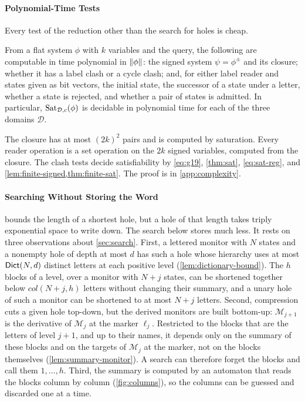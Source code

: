 \paragraph{Polynomial-Time Tests}
Every test of the reduction other than the search for holes is cheap.

\begin{lemma}\label{lem:poly-tests}
From a flat system $\phi$ with $k$ variables and the query, the following are
computable in time polynomial in $\|\phi\|$: the signed system
$\psi=\phi^\pm$ and its closure; whether it has a
label clash or a cycle clash; and, for either label reader and states given
as bit vectors, the initial state, the successor of a state under a letter,
whether a state is rejected, and whether a pair of states is admitted. In
particular, $\operatorname{Sat}_{\mathcal D,c}(\phi)$ is decidable in polynomial time for
each of the three domains $\mathcal D$.
\end{lemma}

The closure has at most $(2k)^2$ pairs and is computed by saturation. Every
reader operation is a set operation on the $2k$ signed variables, computed
from the closure. The clash tests decide satisfiability by \eqref{eq:g19},
\cref{thm:sat}, \eqref{eq:sat-reg}, and \cref{lem:finite-signed,thm:finite-sat}.
The proof is in \cref{app:complexity}.

\paragraph{Searching Without Storing the Word}
 bounds the length of a shortest hole, but a hole of
that length takes triply exponential space to write down. The search below
stores much less. It rests on three observations about \cref{sec:search}.
First, a lettered monitor with $N$ states and a nonempty hole of depth at
most $d$ has such a hole whose hierarchy uses at most $\mathsf{Dict}(N,d)$ distinct letters at each positive
level (\cref{lem:dictionary-bound}). The $h$ blocks of a level, over a monitor
with $N+j$ states, can be shortened together below $\mathit{col}(N+j,h)$
letters without changing their summary, and a unary hole of such a monitor
can be shortened to at most $N+j$ letters. Second, compression cuts a given
hole top-down, but the derived monitors are built bottom-up:
$\mathcal M_{j+1}$ is the derivative of $\mathcal M_j$ at the marker
$\ell_j$. Restricted to the blocks that are the letters of level $j+1$, and
up to their names, it depends only on the summary of these blocks and on the
targets of $\mathcal M_j$ at the marker, not on the blocks themselves
(\cref{lem:summary-monitor}). A search can therefore forget the blocks and
call them $1,\ldots,h$. Third, the summary is computed by an automaton that
reads the blocks column by column (\cref{fig:columns}), so the columns can be
guessed and discarded one at a time.

